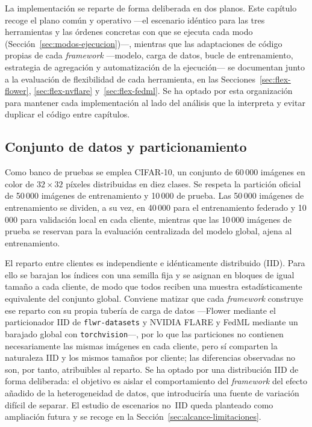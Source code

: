 La implementación se reparte de forma deliberada en dos planos. Este capítulo recoge el
plano común y operativo —el escenario idéntico para las tres herramientas y las órdenes
concretas con que se ejecuta cada modo (Sección~\ref{sec:modos-ejecucion})—, mientras que
las adaptaciones de código propias de cada \textit{framework} —modelo, carga de datos,
bucle de entrenamiento, estrategia de agregación y automatización de la ejecución— se
documentan junto a la evaluación de flexibilidad de cada herramienta, en las
Secciones~\ref{sec:flex-flower}, \ref{sec:flex-nvflare} y~\ref{sec:flex-fedml}. Se ha
optado por esta organización para mantener cada implementación al lado del análisis que la
interpreta y evitar duplicar el código entre capítulos.

\subsection{Conjunto de datos y particionamiento}\label{sec:datos}

Como banco de pruebas se emplea CIFAR-10, un conjunto de 60\,000 imágenes en color de
$32\times32$ píxeles distribuidas en diez clases. Se respeta la partición oficial de
50\,000 imágenes de entrenamiento y 10\,000 de prueba. Las 50\,000 imágenes de entrenamiento se
dividen, a su vez, en 40\,000 para el entrenamiento federado y 10\,000 para validación local en
cada cliente, mientras que las 10\,000 imágenes de prueba se reservan para la evaluación
centralizada del modelo global, ajena al entrenamiento.

El reparto entre clientes es independiente e idénticamente distribuido (IID). Para ello se
barajan los índices con una semilla fija y se asignan en bloques de igual tamaño a cada cliente,
de modo que todos reciben una muestra estadísticamente equivalente del conjunto global. Conviene
matizar que cada \textit{framework} construye ese reparto con su propia tubería de carga de
datos —Flower mediante el particionador IID de \texttt{flwr-datasets} y NVIDIA FLARE y FedML
mediante un barajado global con \texttt{torchvision}—, por lo que las particiones no contienen
necesariamente las mismas imágenes en cada cliente, pero sí comparten la naturaleza IID y los
mismos tamaños por cliente; las diferencias observadas no son, por tanto, atribuibles al reparto.
Se ha
optado por una distribución IID de forma deliberada: el objetivo es aislar el comportamiento del
\textit{framework} del efecto añadido de la heterogeneidad de datos, que introduciría una
fuente de variación difícil de separar. El estudio de escenarios no~IID queda planteado como
ampliación futura y se recoge en la Sección~\ref{sec:alcance-limitaciones}.

